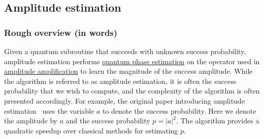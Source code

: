 










\newpage


\begin{refsection}
\subsection{Amplitude estimation}\label{prim:AmpEst}



\subsubsection*{Rough overview (in words)}
Given a quantum subroutine that succeeds with unknown success probability, amplitude estimation performs \hyperref[prim:QPE]{quantum phase estimation} on the operator used in \hyperref[prim:AmpAmp]{amplitude amplification} to learn the magnitude of the success amplitude. While the algorithm is referred to as amplitude estimation, it is often the success probability that we wish to compute, and the complexity of the algorithm is often presented accordingly. For example, the original paper introducing amplitude estimation~\cite{brassard2002AmpAndEst} uses the variable $a$ to denote the success probability. Here we denote the amplitude by $a$ and the success probability $p = |a|^2$. The algorithm provides a quadratic speedup over classical methods for estimating $p$.




\end{refsection}

